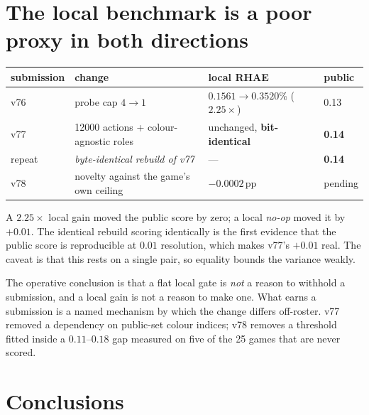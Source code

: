 \documentclass[11pt,a4paper]{article}
\newcommand{\pp}{\,\text{pp}}
\begin{document}
\section{The local benchmark is a poor proxy in both directions}

\begin{center}
\begin{tabular}{llll}
\toprule
submission & change & local RHAE & public \\
\midrule
v76 & probe cap $4\to1$ & $0.1561 \to 0.3520\%$ ($2.25\times$) & 0.13 \\
v77 & 12000 actions + colour-agnostic roles & unchanged, \textbf{bit-identical} & \textbf{0.14} \\
repeat & \emph{byte-identical rebuild of v77} & --- & \textbf{0.14} \\
v78 & novelty against the game's own ceiling & $-0.0002\pp$ & pending \\
\bottomrule
\end{tabular}
\end{center}

A $2.25\times$ local gain moved the public score by zero; a local \emph{no-op} moved it
by $+0.01$. The identical rebuild scoring identically is the first evidence that the
public score is reproducible at $0.01$ resolution, which makes v77's $+0.01$ real. The
caveat is that this rests on a single pair, so equality bounds the variance weakly.

The operative conclusion is that a flat local gate is \emph{not} a reason to withhold a
submission, and a local gain is not a reason to make one. What earns a submission is a
named mechanism by which the change differs off-roster. v77 removed a dependency on
public-set colour indices; v78 removes a threshold fitted inside a $0.11$--$0.18$ gap
measured on five of the 25 games that are never scored.

\section{Conclusions}
\end{document}
